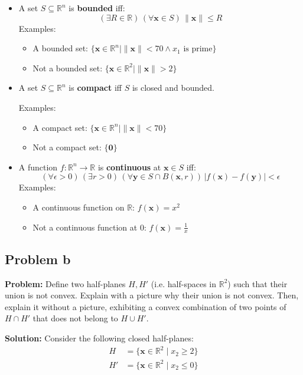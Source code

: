 \documentclass{article}
\renewcommand\vec{\mathbf}
\newcommand{\R}{\mathbb R}
\begin{document}
\begin{itemize}
    \item A set $S\subseteq\R^n$ is \textbf{bounded} iff:
    $$(\exists R\in\R)\,(\forall\vec x\in S)\, \|\vec x\|\le R$$
    Examples:
    \begin{itemize}[label = -]
        \item A bounded set: $\{\vec x\in\R^n\mid \|\vec x\|<70 \wedge x_1\text{ is prime}\}$
        \item Not a bounded set: $\{\vec x\in\R^2\mid \|\vec x\| > 2\}$
    \end{itemize}

    \item A set $S\subseteq\R^n$ is \textbf{compact} iff $S$ is closed and bounded.
    
    Examples:
    \begin{itemize}[label = -]
        \item A compact set: $\{\vec x\in\R^n\mid \|\vec x\|<70\}$
        \item Not a compact set: $\{\vec 0\}$
    \end{itemize}

    \item A function $f:\R^n\to\R$ is \textbf{continuous} at $\vec x\in S$ iff:
    $$(\forall\epsilon>0)\,(\exists r>0)\,(\forall\vec y\in S\cap B(\vec x,r))\, |f(\vec x)-f(\vec y)|<\epsilon$$
    Examples:
    \begin{itemize}[label = -]
        \item A continuous function on $\R$: $f(\vec x)=x^2$
        \item Not a continuous function at 0: $f(\vec x)=\frac{1}{x}$
    \end{itemize}
\end{itemize}

\subsection*{Problem b}
\noindent\textbf{Problem:} Define two half-planes $H,H'$ (i.e. half-spaces in $\R^2$) such that their union is not convex. Explain with a picture why their union is not convex. Then, explain it without a picture, exhibiting a convex combination of two points of $H\cap H'$ that does not belong to $H\cup H'$.
\bigskip

\noindent\textbf{Solution:} Consider the following closed half-planes:
\begin{align*}
    H&=\{\vec x\in\R^2\mid x_2\ge 2\}\\
    H'&=\{\vec x\in\R^2\mid x_2\le 0\}\\
\end{align*}
\end{document}
